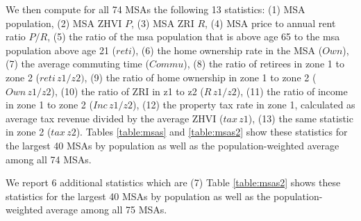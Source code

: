 \documentclass[letterpaper,12pt,dvipsnames,usenames]{article}
\theoremstyle{definition}
\begin{document}
\begin{spacing}{1.0}
\begin{small}
We then compute for all 74 MSAs the following 13 statistics: (1) MSA population, (2) MSA ZHVI $P$, (3) MSA ZRI $R$, (4) MSA price to annual rent ratio $P/R$, (5) the ratio of the msa population that is above age 65 to the msa population above age 21 ($reti$),  (6) the home ownership rate in the MSA ($Own$), (7) the average commuting time ($Commu$), (8) the ratio of retirees in zone 1 to zone 2 ($reti \, z1/z2)$, (9) the ratio of home ownership in zone 1 to zone 2 ($Own \, z1/z2$), (10) the ratio of ZRI in z1 to z2 ($R \, z1/z2$), (11) the ratio of income in zone 1 to zone 2 ($Inc \, z1/z2$), (12) the property tax rate in zone 1, calculated as average tax revenue divided by the average ZHVI ($tax\,z1$), (13) the same statistic in zone 2 ($tax \, z2$). Tables \ref{table:msas} and \ref{table:msas2} show these statistics for the largest 40 MSAs by population as well as the population-weighted average among all 74 MSAs.


We report 6 additional statistics which are (7)
Table \ref{table:msas2} shows these statistics for the largest 40 MSAs by population as well as the population-weighted average among all 75 MSAs.


\end{small}
\end{spacing}
\end{document}
